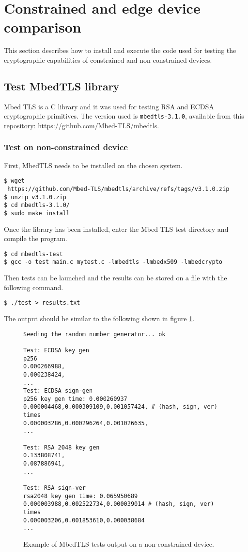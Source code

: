 
\section{Constrained and edge device comparison}
This section describes how to install and execute the code used for testing the cryptographic capabilities of constrained and non-constrained devices.
\subsection{Test MbedTLS library}
Mbed TLS \cite{mbed-tls} is a C library and it was used for testing RSA and ECDSA cryptographic primitives. The version used is \texttt{mbedtls-3.1.0}, available from this repository: \url{https://github.com/Mbed-TLS/mbedtls}. 

\subsubsection{Test on non-constrained device}
First, MbedTLS needs to be installed on the chosen system. \\
\begin{lstlisting}[style=terminal,frame=single]
$ wget 
 https://github.com/Mbed-TLS/mbedtls/archive/refs/tags/v3.1.0.zip
$ unzip v3.1.0.zip
$ cd mbedtls-3.1.0/
$ sudo make install
\end{lstlisting}
Once the library has been installed, enter the Mbed TLS test directory and compile the program.  \\
\begin{lstlisting}[style=terminal,frame=single]
$ cd mbedtls-test
$ gcc -o test main.c mytest.c -lmbedtls -lmbedx509 -lmbedcrypto
\end{lstlisting}
Then tests can be launched and the results can be stored on a file with the following command. \\
\begin{lstlisting}[style=terminal,frame=single]
$ ./test > results.txt
\end{lstlisting}
The output should be similar to the following shown in figure \ref{l-mbedtls-1}. \\
\begin{figure}[H]
\begin{lstlisting}[frame=single]
Seeding the random number generator... ok

Test: ECDSA key gen
p256
0.000266988,
0.000238424,
...
Test: ECDSA sign-gen
p256 key gen time: 0.000260937
0.000004468,0.000309109,0.001057424, # (hash, sign, ver) times
0.000003286,0.000296264,0.001026635,
...

Test: RSA 2048 key gen
0.133808741,
0.087886941,
...

Test: RSA sign-ver
rsa2048 key gen time: 0.065950689
0.000003988,0.002522734,0.000039014 # (hash, sign, ver) times
0.000003206,0.001853610,0.000038684
...
\end{lstlisting}
\caption{Example of MbedTLS tests output on a non-constrained device. \label{l-mbedtls-1}}
\end{figure}
